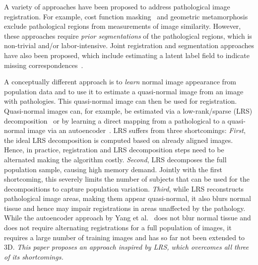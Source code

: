 \documentclass{article}
\begin{document}
A variety of approaches have been proposed to address pathological image registration. For example, cost function masking~\cite{brett2001} and geometric metamorphosis~\cite{niethammer2011} exclude pathological regions from measurements of image similarity. However, these approaches require \emph{prior segmentations} of the pathological regions, which is non-trivial and/or labor-intensive. Joint registration and segmentation approaches have also been proposed, which include estimating a latent label field to indicate missing correspondences~\cite{chitphakdithai2010,kwon2014}.

A conceptually different approach is to \emph{learn} normal image appearance from population data and to use it to estimate a quasi-normal image from an image with pathologies. This quasi-normal image can then be used for registration. Quasi-normal images can, for example, be estimated via a low-rank/sparse (LRS) decomposition~\cite{Liu2015} or by learning a direct mapping from a pathological to a quasi-normal image via an autoencoder~\cite{yang2016_autoencoder}. LRS suffers from three shortcomings: \emph{First}, the ideal LRS decomposition is computed based on already aligned images. Hence, in practice, registration and LRS decomposition steps need to be alternated making the algorithm costly. \emph{Second}, LRS decomposes the full population sample, causing high memory demand. Jointly with the first shortcoming, this severely limits the number of subjects that can be used for the decompositions to capture population variation. \emph{Third}, while LRS reconstructs pathological image areas, making them appear quasi-normal, it also blurs normal tissue and hence may impair registrations in areas unaffected by the pathology. While the autoencoder approach by Yang et al.~\cite{yang2016_autoencoder} does not blur normal tissue and does not require alternating registrations for a full population of images, it requires a large number of training images and has so far not been extended to 3D. \emph{This paper proposes an approach inspired by LRS, which overcomes all three of its shortcomings.}
\end{document}
